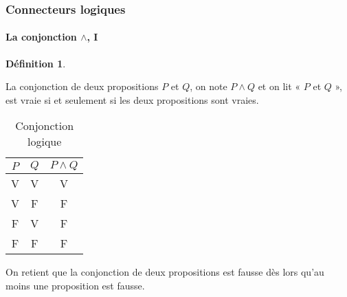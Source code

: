 \documentclass[10pt,notheorems]{beamer}
\theoremstyle{plain}
\theoremstyle{definition} %
\newtheorem{definition}{Définition}
\begin{document}
\begin{frame}
  \frametitle{Connecteurs logiques}
  \framesubtitle{La conjonction $\land$, I}
  \hypertarget{slide_conjonction_1}{}

  \begin{definition}\label{def:conjonction}

    La conjonction de deux propositions $P$ et $Q$, on note $P\land Q$
    et on lit « $P$ et $Q$ », est vraie si et seulement si les
    deux propositions sont vraies.
  \end{definition}

  \bigskip

  \begin{table}[H]

    \centering
    \begin{tabular}[H]{|cc|c|}
      \hline
      $P$ & $Q$ & $P \land Q$\\ \hline
      V & V & V \\
      V & F & F \\
      F & V & F \\
      F & F & F \\
      \hline\hline
    \end{tabular}
    \caption{Conjonction logique}
    \label{tab:conjonction}
  \end{table}

  \bigskip

  On retient que la conjonction de deux propositions est fausse dès
  lors qu'au moins une proposition est fausse.

\end{frame}
\end{document}
